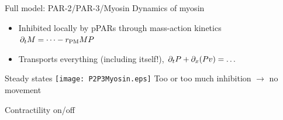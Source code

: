 \documentclass{beamer}
\newcommand{\6}[1]{#1_{\text{6}}}
\newcommand{\3}[1]{#1_{\text{3}}}
\begin{document}
\begin{frame}{Full model: PAR-2/PAR-3/Myosin}
Dynamics of myosin
\begin{itemize}
\item Inhibited locally by pPARs through mass-action kinetics $\partial_t{M}=\dots -r_\text{PM} M P$
\item Transports everything (including itself!), $\partial_t{P}+\partial_x{\left(P v\right)}=\dots$
\end{itemize}
\begin{center}
\end{center}
\end{frame}

\begin{frame}{Steady states}
\texttt{[image: P2P3Myosin.eps]}
Too or too much inhibition $\rightarrow$ no movement
\end{frame}

\begin{frame}{Contractility on/off}
\begin{center}
\end{center}
\end{frame}
\end{document}
